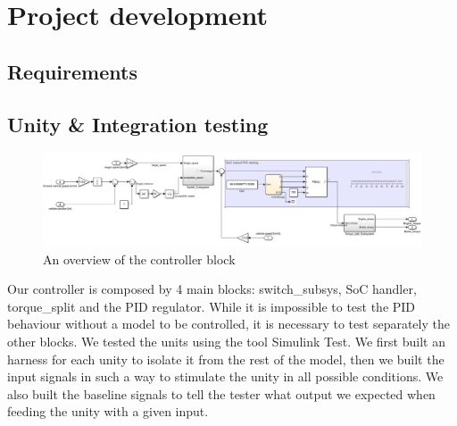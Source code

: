 \documentclass[12pt,a4paper]{report}
\begin{document}
\chapter{Project development}

\section{Requirements}
\section{Unity \& Integration testing}
\begin{figure}[!h]
	\centering
	\includegraphics[scale=0.34]{Controller_overview.jpg}
	\caption{An overview of the controller block}
	\label{Controller_overview}
\end{figure}
Our controller is composed by 4 main blocks: switch\_subsys, SoC handler, torque\_split and the PID regulator.
While it is impossible to test the PID behaviour without a model to be controlled, it is necessary to test separately the other blocks.
We tested the units using the tool Simulink Test. We first built an harness for each unity to isolate it from the rest of the model, then we built the input signals in such a way to stimulate the unity in all possible conditions. We also built the baseline signals to tell the tester what output we expected when feeding the unity with a given input. 
\newpage
\end{document}
